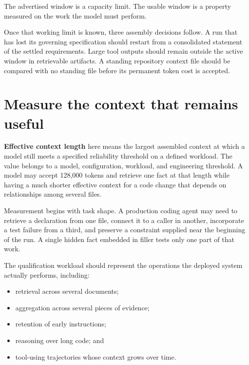 The advertised window is a capacity limit. The usable window is a property measured on the work the model must perform.

Once that working limit is known, three assembly decisions follow. A run that has lost its governing specification should restart from a consolidated statement of the settled requirements. Large tool outputs should remain outside the active window in retrievable artifacts. A standing repository context file should be compared with no standing file before its permanent token cost is accepted.

\hypertarget{measure-the-context-that-remains-useful}{%
\section{Measure the context that remains useful}\label{measure-the-context-that-remains-useful}}

\textbf{Effective context length} here means the largest assembled context at which a model still meets a specified reliability threshold on a defined workload. The value belongs to a model, configuration, workload, and engineering threshold. A model may accept 128,000 tokens and retrieve one fact at that length while having a much shorter effective context for a code change that depends on relationships among several files.

Measurement begins with task shape. A production coding agent may need to retrieve a declaration from one file, connect it to a caller in another, incorporate a test failure from a third, and preserve a constraint supplied near the beginning of the run. A single hidden fact embedded in filler tests only one part of that work.


The qualification workload should represent the operations the deployed system actually performs, including:

\begin{itemize}
\tightlist
\item
  retrieval across several documents;
\item
  aggregation across several pieces of evidence;
\item
  retention of early instructions;
\item
  reasoning over long code; and
\item
  tool-using trajectories whose context grows over time.
\end{itemize}

